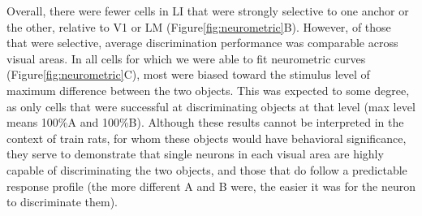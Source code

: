 
Overall, there were fewer cells in LI that were strongly selective to one anchor or the other, relative to V1 or LM (Figure\ref{fig:neurometric}B). However, of those that were selective, average discrimination performance was comparable across visual areas. In all cells for which we were able to fit neurometric curves (Figure\ref{fig:neurometric}C), most were biased toward the stimulus level of maximum difference between the two objects. This was expected to some degree, as only cells that were successful at discriminating objects at that level (max level means 100\%A and 100\%B). Although these results cannot be interpreted in the context of train rats, for whom these objects would have behavioral significance, they serve to demonstrate that single neurons in each visual area are highly capable of discriminating the two objects, and those that do follow a predictable response profile (the more different A and B were, the easier it was for the neuron to discriminate them).  


